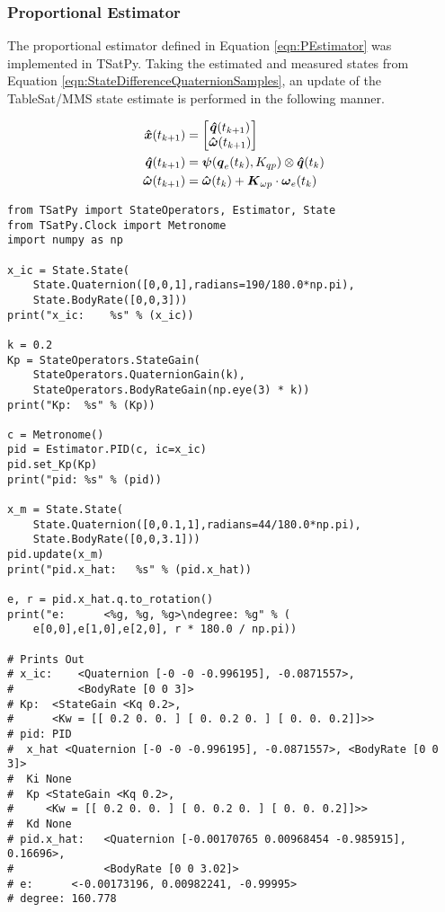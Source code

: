 \subsubsection{Proportional Estimator}
\label{subsubsec:ProportionalEstimator}

The proportional estimator defined in Equation \ref{eqn:PEstimator} was implemented in TSatPy.  Taking the estimated and measured states from Equation \ref{eqn:StateDifferenceQuaternionSamples}, an update of the TableSat/MMS state estimate is performed in the following manner.

\begin{subequations}
  \begin{align}
    \boldsymbol{\hat{x}}(t_{k+1}) &= \begin{bmatrix} \boldsymbol{\hat{q}}(t_{k+1}) \\ \boldsymbol{\hat{\omega}}(t_{k+1}) \end{bmatrix} \\
    \boldsymbol{\hat{q}}(t_{k+1}) &= \boldsymbol{\psi}(\boldsymbol{q}_e(t_{k}), K_{qp}) \otimes \boldsymbol{\hat{q}}(t_{k}) \\
    \boldsymbol{\hat{\omega}}(t_{k+1}) &= \boldsymbol{\hat{\omega}}(t_{k}) + \boldsymbol{K}_{\omega p} \cdot \boldsymbol{\omega}_e(t_{k})
  \end{align}
  \label{eqn:PEstimator}
\end{subequations}

\begin{singlespace}
  \begin{verbatim}
from TSatPy import StateOperators, Estimator, State
from TSatPy.Clock import Metronome
import numpy as np

x_ic = State.State(
    State.Quaternion([0,0,1],radians=190/180.0*np.pi),
    State.BodyRate([0,0,3]))
print("x_ic:    %s" % (x_ic))

k = 0.2
Kp = StateOperators.StateGain(
    StateOperators.QuaternionGain(k),
    StateOperators.BodyRateGain(np.eye(3) * k))
print("Kp:  %s" % (Kp))

c = Metronome()
pid = Estimator.PID(c, ic=x_ic)
pid.set_Kp(Kp)
print("pid: %s" % (pid))

x_m = State.State(
    State.Quaternion([0,0.1,1],radians=44/180.0*np.pi),
    State.BodyRate([0,0,3.1]))
pid.update(x_m)
print("pid.x_hat:   %s" % (pid.x_hat))

e, r = pid.x_hat.q.to_rotation()
print("e:      <%g, %g, %g>\ndegree: %g" % (
    e[0,0],e[1,0],e[2,0], r * 180.0 / np.pi))

# Prints Out
# x_ic:    <Quaternion [-0 -0 -0.996195], -0.0871557>,
#          <BodyRate [0 0 3]>
# Kp:  <StateGain <Kq 0.2>,
#      <Kw = [[ 0.2 0. 0. ] [ 0. 0.2 0. ] [ 0. 0. 0.2]]>>
# pid: PID
#  x_hat <Quaternion [-0 -0 -0.996195], -0.0871557>, <BodyRate [0 0 3]>
#  Ki None
#  Kp <StateGain <Kq 0.2>,
#     <Kw = [[ 0.2 0. 0. ] [ 0. 0.2 0. ] [ 0. 0. 0.2]]>>
#  Kd None
# pid.x_hat:   <Quaternion [-0.00170765 0.00968454 -0.985915], 0.16696>,
#              <BodyRate [0 0 3.02]>
# e:      <-0.00173196, 0.00982241, -0.99995>
# degree: 160.778
  \end{verbatim}
\nocite{minted}
\end{singlespace}

